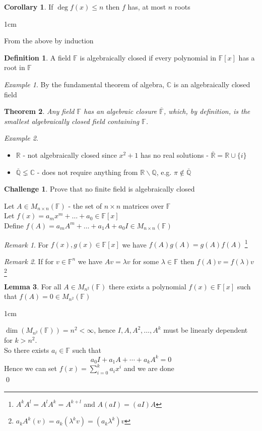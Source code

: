\documentclass[11pt, a4paper]{report}
\makeatletter
\numberwithin{equation}{section}
\newcommand{\bk}{\backslash}
\newcommand{\R}{\mathbb{R}}
\newcommand{\C}{\mathbb{C}}
\newcommand{\F}{\mathbb{F}}
\newcommand{\Q}{\mathbb{Q}}
\newcommand{\nin}{\not\in}
\numberwithin{equation}{subsection}
\theoremstyle{plain}
\newtheorem{thm}{Theorem}[chapter] %
\theoremstyle{definition}
\newtheorem{defn}{Definition}[chapter]
\newtheorem{ch}{Challenge}
\newtheorem{lem}[thm]{Lemma}
\newtheorem{cor}[thm]{Corollary}
\theoremstyle{remark}
\newtheorem*{rem}{Remark}
\newtheorem{exmp}{Example}[chapter]
\newtheorem*{prf}{Proof}
\renewenvironment{prf}[1][\proofname]{\par
  \vspace{-\topsep}%
  \normalfont
  \topsep0pt \partopsep0pt %
  \trivlist
  \item[\hskip\labelsep
        \itshape
    #1\@addpunct{.}]\ignorespaces
}{%
  \popQED\endtrivlist\@endpefalse
  \addvspace{6pt plus 6pt} %
}
\newcommand{\pr}[1]{\begin{adjustwidth}{1cm}{} \begin{prf} #1 \end{prf} \end{adjustwidth}}
\makeatother
\begin{document}
\begin{cor} If $\deg f(x) \leq n$ then $f$ has, at most $n$ roots
\pr{
From the above by induction
}
\end{cor}

\begin{defn} A field $\F$ is algebraically closed if every polynomial in $\F[x]$ has a root in $\F$ \end{defn}

\begin{exmp} By the fundamental theorem of algebra, $\C$ is an algebraically closed field \end{exmp}

\begin{thm}
Any field $\F$ has an algebraic closure $\overline{\F}$, which, by definition, is the smallest algebraically closed field containing $\F$.
\end{thm}

\begin{exmp}${}$
\begin{itemize}
\item[] 	$\R$ - not algebraically closed since $x^2 + 1$ has no real solutions - $\overline{\R} = \R \cup \{i\}$
\item[]		$\overline{\Q} \lneq \C$ - does not require anything from $\R \bk \Q$, e.g. $\pi \nin \overline{\Q}$
\end{itemize}
\end{exmp}

\begin{ch} Prove that no finite field is algebraically closed \end{ch}

Let $A \in M_{n \times n}(\F)$ - the set of $n \times n$ matrices over $\F$\\
Let $f(x) = a_mx^m + \ldots + a_0 \in \F[x]$\\
Define $f(A) = a_mA^m + \ldots + a_1A + a_0I \in M_{n \times n}(\F)$

\begin{rem} For $f(x), g(x) \in \F[x]$ we have $f(A) g(A) = g(A) f(A)$ \footnote{$A^k A^l = A^l A^k = A^{k+l}$ and $A(aI) = (aI)A$} \end{rem}
\begin{rem} If for $v \in \F^n$ we have $Av = \lambda v$ for some $\lambda \in \F$ then $f(A)v = f(\lambda) v$ \footnote{$a_kA^k(v) = a_k(\lambda^k v) = (a_k \lambda^k)v$} \end{rem}

\begin{lem}
For all $A \in M_{n^2}(\F)$ there exists a polynomial $f(x) \in \F[x]$ such that $f(A) = 0 \in M_{n^2}(\F)$
\pr{
$\dim(M_{n^2}(\F)) = n^2 < \infty$, hence $I, A, A^2, \ldots, A^k$ must be linearly dependent for $k > n^2$.\\
So there exists $a_i \in \F$ such that
$$a_0I + a_1 A + \cdots + a_k A^k = 0$$
Hence we can set $f(x) = \sum_{i=0}^k a_i x^i$ and we are done\\[-8pt] \qed
}
\end{lem}
\end{document}

